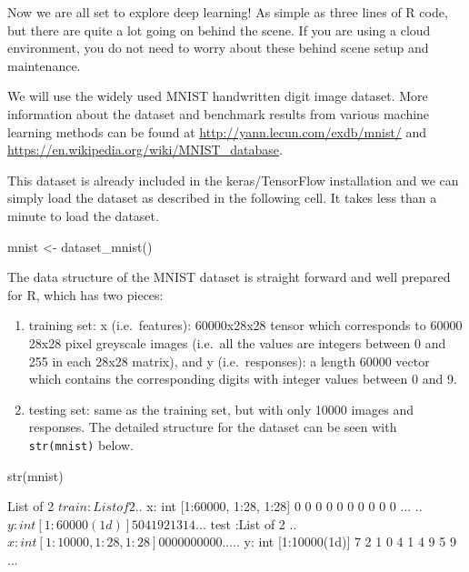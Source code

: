 \documentclass[
  12pt,
]{krantz}
\makeatletter
\newenvironment{Shaded}{\begin{snugshade}}{\end{snugshade}}
\newcommand{\FunctionTok}[1]{\textcolor[rgb]{0,0,0}{#1}}
\newcommand{\NormalTok}[1]{#1}
\newcommand{\OtherTok}[1]{\textcolor[rgb]{0.37,0.37,0.37}{#1}}
\newenvironment{kframe}{%
\medskip{}
\setlength{\fboxsep}{.8em}
 \def\at@end@of@kframe{}%
 \ifinner\ifhmode%
  \def\at@end@of@kframe{\end{minipage}}%
  \begin{minipage}{\columnwidth}%
 \fi\fi%
 \def\FrameCommand##1{\hskip\@totalleftmargin \hskip-\fboxsep
 \colorbox{shadecolor}{##1}\hskip-\fboxsep
     \hskip-\linewidth \hskip-\@totalleftmargin \hskip\columnwidth}%
 \MakeFramed {\advance\hsize-\width
   \@totalleftmargin\z@ \linewidth\hsize
   \@setminipage}}%
 {\par\unskip\endMakeFramed%
 \at@end@of@kframe}
\renewenvironment{Shaded}{\begin{kframe}}{\end{kframe}}
\makeatother
\begin{document}
Now we are all set to explore deep learning! As simple as three lines of R code, but there are quite a lot going on behind the scene. If you are using a cloud environment, you do not need to worry about these behind scene setup and maintenance.

We will use the widely used MNIST handwritten digit image dataset. More information about the dataset and benchmark results from various machine learning methods can be found at \url{http://yann.lecun.com/exdb/mnist/} and \url{https://en.wikipedia.org/wiki/MNIST_database}.

This dataset is already included in the keras/TensorFlow installation and we can simply load the dataset as described in the following cell. It takes less than a minute to load the dataset.

\begin{Shaded}
\begin{Highlighting}[]
\NormalTok{mnist }\OtherTok{\textless{}{-}} \FunctionTok{dataset\_mnist}\NormalTok{()}
\end{Highlighting}
\end{Shaded}

The data structure of the MNIST dataset is straight forward and well prepared for R, which has two pieces:

\begin{enumerate}
\def\labelenumi{(\arabic{enumi})}
\item
  training set: x (i.e.~features): 60000x28x28 tensor which corresponds to 60000 28x28 pixel greyscale images (i.e.~all the values are integers between 0 and 255 in each 28x28 matrix), and y (i.e.~responses): a length 60000 vector which contains the corresponding digits with integer values between 0 and 9.
\item
  testing set: same as the training set, but with only 10000 images and responses. The detailed structure for the dataset can be seen with \texttt{str(mnist)} below.
\end{enumerate}

\begin{Shaded}
\begin{Highlighting}[]
\FunctionTok{str}\NormalTok{(mnist)}
\end{Highlighting}
\end{Shaded}

\begin{Shaded}
\begin{Highlighting}[]
\NormalTok{List of 2}
\NormalTok{ $ train:List of 2}
\NormalTok{  ..$ x: int [1:60000, 1:28, 1:28] 0 0 0 0 0 0 0 0 0 0 ...}
\NormalTok{  ..$ y: int [1:60000(1d)] 5 0 4 1 9 2 1 3 1 4 ...}
\NormalTok{ $ test :List of 2}
\NormalTok{  ..$ x: int [1:10000, 1:28, 1:28] 0 0 0 0 0 0 0 0 0 0 ...}
\NormalTok{  ..$ y: int [1:10000(1d)] 7 2 1 0 4 1 4 9 5 9 ...}
\end{Highlighting}
\end{Shaded}
\end{document}
